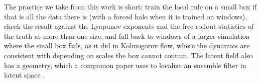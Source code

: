 The practice we take from this work is short: train the local rule on a
small box if that is all the data there is (with a forced halo when it is
trained on windows), check the result against the Lyapunov exponents and
the free-rollout statistics of the truth at more than one size, and fall
back to windows of a larger simulation where the small box fails, as it
did in Kolmogorov flow, where the dynamics are consistent with depending on
scales the box cannot contain. The latent field also has a
geometry, which a companion paper uses to localize an ensemble filter in
latent space \citep{jones2026da}.
